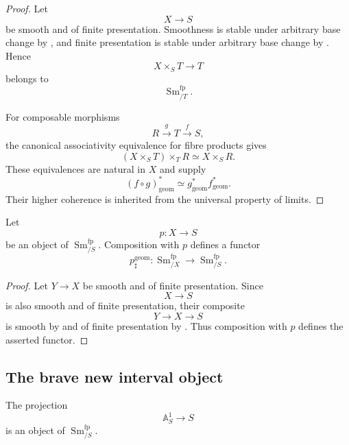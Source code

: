 \begin{proof}
Let
\[
    X
    \longrightarrow
    S
\]
be smooth and of finite presentation. Smoothness is stable under
arbitrary base change by
, and finite presentation is
stable under arbitrary base change by
. Hence
\[
    X\times_ST
    \longrightarrow
    T
\]
belongs to
\[
    \operatorname{Sm}^{\mathrm{fp}}_{/T}.
\]

For composable morphisms
\[
    R
    \xrightarrow{g}
    T
    \xrightarrow{f}
    S,
\]
the canonical associativity equivalence for fibre products gives
\[
    (X\times_ST)\times_TR
    \simeq
    X\times_SR.
\]
These equivalences are natural in \(X\) and supply
\[
    (f\circ g)^*_{\mathrm{geom}}
    \simeq
    g^*_{\mathrm{geom}}f^*_{\mathrm{geom}}.
\]
Their higher coherence is inherited from the universal property of
limits.
\end{proof}

\begin{proposition}
\label{prop:smooth-composition-functor}
Let
\[
    p
    \colon
    X
    \longrightarrow
    S
\]
be an object of $\operatorname{Sm}^{\mathrm{fp}}_{/S}$. Composition with
$p$ defines a functor
\[
    p_{\sharp}^{\mathrm{geom}}
    \colon
    \operatorname{Sm}^{\mathrm{fp}}_{/X}
    \longrightarrow
    \operatorname{Sm}^{\mathrm{fp}}_{/S}.
\]
\end{proposition}\begin{proof}
Let $Y\to X$ be smooth and of finite presentation. Since
\[
    X\longrightarrow S
\]
is also smooth and of finite presentation, their composite
\[
    Y
    \longrightarrow
    X
    \longrightarrow
    S
\]
is smooth by
 and of finite presentation by
. Thus composition with
$p$ defines the asserted functor.
\end{proof}

\subsection{The brave new interval object}

\begin{proposition}
\label{prop:affine-line-in-smooth-site}
The projection
\[
    \mathbb A^1_S
    \longrightarrow
    S
\]
is an object of $\operatorname{Sm}^{\mathrm{fp}}_{/S}$.
\end{proposition}

